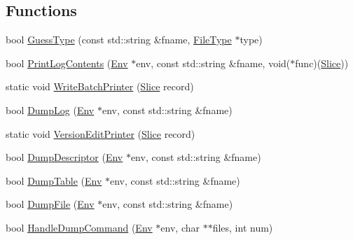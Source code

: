 \subsection*{Functions}
\begin{DoxyCompactItemize}
\item 
bool \hyperlink{namespaceleveldb_1_1anonymous__namespace_02leveldb__main_8cc_03_a42d54d4e0eb590df4bba459131b6c8d3}{Guess\+Type} (const std\+::string \&fname, \hyperlink{namespaceleveldb_ab8e559ac5cadcb2b5dd531c60df944f1}{File\+Type} $\ast$type)
\item 
bool \hyperlink{namespaceleveldb_1_1anonymous__namespace_02leveldb__main_8cc_03_a9212c400679f75d9fb1ed7fd08611404}{Print\+Log\+Contents} (\hyperlink{classleveldb_1_1_env}{Env} $\ast$env, const std\+::string \&fname, void($\ast$func)(\hyperlink{classleveldb_1_1_slice}{Slice}))
\item 
static void \hyperlink{namespaceleveldb_1_1anonymous__namespace_02leveldb__main_8cc_03_ae7c55c4d94311c47efaab97c711bfa1b}{Write\+Batch\+Printer} (\hyperlink{classleveldb_1_1_slice}{Slice} record)
\item 
bool \hyperlink{namespaceleveldb_1_1anonymous__namespace_02leveldb__main_8cc_03_aeadd7872fff20a9f13b2c81377307bb6}{Dump\+Log} (\hyperlink{classleveldb_1_1_env}{Env} $\ast$env, const std\+::string \&fname)
\item 
static void \hyperlink{namespaceleveldb_1_1anonymous__namespace_02leveldb__main_8cc_03_a92c0c5c59ff201b0480664cdd732f171}{Version\+Edit\+Printer} (\hyperlink{classleveldb_1_1_slice}{Slice} record)
\item 
bool \hyperlink{namespaceleveldb_1_1anonymous__namespace_02leveldb__main_8cc_03_aac1f891b5b8cff7826dea82d6fd4975a}{Dump\+Descriptor} (\hyperlink{classleveldb_1_1_env}{Env} $\ast$env, const std\+::string \&fname)
\item 
bool \hyperlink{namespaceleveldb_1_1anonymous__namespace_02leveldb__main_8cc_03_a5c0bfecd020ea984aab01c6aa9a8816a}{Dump\+Table} (\hyperlink{classleveldb_1_1_env}{Env} $\ast$env, const std\+::string \&fname)
\item 
bool \hyperlink{namespaceleveldb_1_1anonymous__namespace_02leveldb__main_8cc_03_a502a762eb4167f987a355281002f591b}{Dump\+File} (\hyperlink{classleveldb_1_1_env}{Env} $\ast$env, const std\+::string \&fname)
\item 
bool \hyperlink{namespaceleveldb_1_1anonymous__namespace_02leveldb__main_8cc_03_afe5479ed1336c698fdce3f73115a6b33}{Handle\+Dump\+Command} (\hyperlink{classleveldb_1_1_env}{Env} $\ast$env, char $\ast$$\ast$files, int num)
\end{DoxyCompactItemize}


